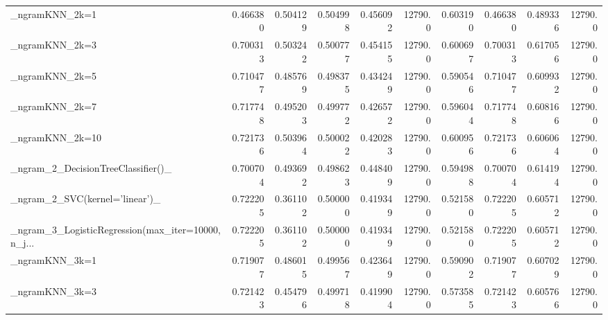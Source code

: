 \begin{tabular}{lrrrrrrrrr}
\_ngramKNN\_2k=1                                     &  0.466380 &         0.504129 &      0.504998 &        0.456092 &        12790.0 &            0.603190 &         0.466380 &           0.489336 &           12790.0 \\
\_ngramKNN\_2k=3                                     &  0.700313 &         0.503242 &      0.500777 &        0.454155 &        12790.0 &            0.600697 &         0.700313 &           0.617056 &           12790.0 \\
\_ngramKNN\_2k=5                                     &  0.710477 &         0.485769 &      0.498375 &        0.434249 &        12790.0 &            0.590546 &         0.710477 &           0.609932 &           12790.0 \\
\_ngramKNN\_2k=7                                     &  0.717748 &         0.495203 &      0.499772 &        0.426572 &        12790.0 &            0.596044 &         0.717748 &           0.608166 &           12790.0 \\
\_ngramKNN\_2k=10                                    &  0.721736 &         0.503964 &      0.500022 &        0.420283 &        12790.0 &            0.600956 &         0.721736 &           0.606064 &           12790.0 \\
\_ngram\_2\_DecisionTreeClassifier()\_                 &  0.700704 &         0.493692 &      0.498623 &        0.448409 &        12790.0 &            0.594988 &         0.700704 &           0.614194 &           12790.0 \\
\_ngram\_2\_SVC(kernel='linear')\_                     &  0.722205 &         0.361102 &      0.500000 &        0.419349 &        12790.0 &            0.521580 &         0.722205 &           0.605712 &           12790.0 \\
\_ngram\_3\_LogisticRegression(max\_iter=10000, n\_j... &  0.722205 &         0.361102 &      0.500000 &        0.419349 &        12790.0 &            0.521580 &         0.722205 &           0.605712 &           12790.0 \\
\_ngramKNN\_3k=1                                     &  0.719077 &         0.486015 &      0.499567 &        0.423649 &        12790.0 &            0.590902 &         0.719077 &           0.607029 &           12790.0 \\
\_ngramKNN\_3k=3                                     &  0.721423 &         0.454796 &      0.499718 &        0.419904 &        12790.0 &            0.573585 &         0.721423 &           0.605766 &           12790.0 \\

\end{tabular}
